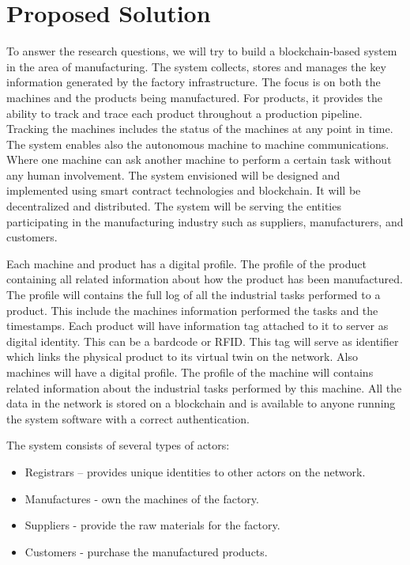 \documentclass[runningheads]{llncs}
\begin{document}
\section{Proposed Solution}
To answer the research questions, we will try to build a blockchain-based system in the area of manufacturing. The system collects, stores and manages the key information generated by the factory infrastructure. The focus is on both the machines and the products being manufactured. For products, it provides the ability to track and trace each product throughout a production pipeline. Tracking the machines includes the status of the machines at any point in time. The system enables also the autonomous machine to machine communications. Where one machine can ask another machine to perform a certain task without any human involvement. The system envisioned will be designed and implemented using smart contract technologies and blockchain. It will be decentralized and distributed. The system will be serving the entities participating in the manufacturing industry such as suppliers, manufacturers, and customers. 

\bigbreak 

\noindent Each machine and product has a digital profile. The profile of the product containing all related information about how the product has been manufactured. The profile will contains the full log of all the industrial tasks performed to a product. This include the machines information performed the tasks and the timestamps. Each product will have information tag attached to it to server as digital identity. This can be a bardcode or RFID. This tag will serve as identifier which links the physical product to its virtual twin on the network. Also machines will have a digital profile. The profile of the machine will contains related information about the industrial tasks performed by this machine. All the data in the network is stored on a blockchain and is available to anyone running the system software with a correct authentication.

\bigbreak

\noindent The system consists of several types of actors:
\begin{itemize}
  \item Registrars – provides unique identities to other actors on the network.
  \item Manufactures - own the machines of the factory.
  \item Suppliers - provide the raw materials for the factory.
  \item Customers - purchase the manufactured products.
\end{itemize}
\end{document}
